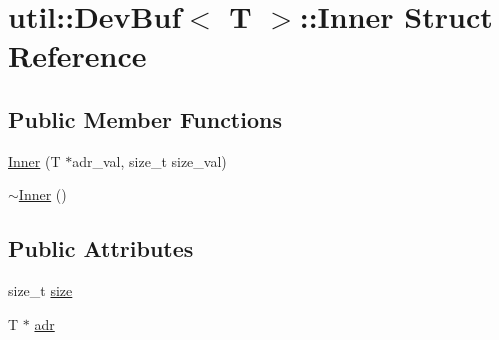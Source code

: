 \hypertarget{structutil_1_1DevBuf_1_1Inner}{\section{util\-:\-:Dev\-Buf$<$ T $>$\-:\-:Inner Struct Reference}
\label{structutil_1_1DevBuf_1_1Inner}
}
\subsection*{Public Member Functions}
\begin{DoxyCompactItemize}
\item 
\hyperlink{structutil_1_1DevBuf_1_1Inner_a878f1b9fd8c6105cabc705d7ec34d914}{Inner} (T $\ast$adr\-\_\-val, size\-\_\-t size\-\_\-val)
\item 
\hyperlink{structutil_1_1DevBuf_1_1Inner_a2600cb1765de86f2612ff05df60df2a9}{$\sim$\-Inner} ()
\end{DoxyCompactItemize}
\subsection*{Public Attributes}
\begin{DoxyCompactItemize}
\item 
size\-\_\-t \hyperlink{structutil_1_1DevBuf_1_1Inner_a49b646d5712c68a37e2ec40f7c309616}{size}
\item 
T $\ast$ \hyperlink{structutil_1_1DevBuf_1_1Inner_a1c24c5bda44e956ec0a3a2bc183e2b28}{adr}
\end{DoxyCompactItemize}


